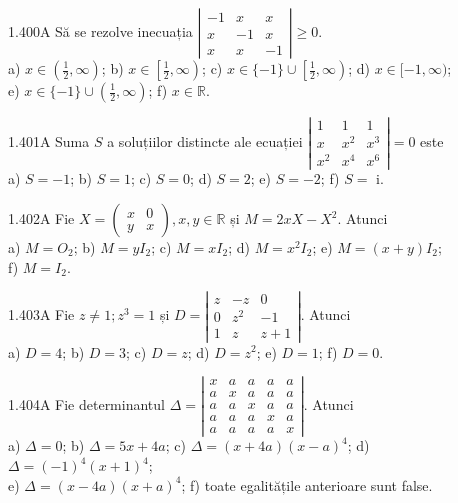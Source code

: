\documentclass[11pt]{article}
\begin{document}
1.400A Să se rezolve inecuația $\left|\begin{array}{ccc}-1 & x & x \\ x & -1 & x \\ x & x & -1\end{array}\right| \geq 0$.\\ a) $x \in\left(\frac{1}{2}, \infty\right)$; b) $x \in\left[\frac{1}{2}, \infty\right)$; c) $x \in\{-1\} \cup\left[\frac{1}{2}, \infty\right)$; d) $x \in[-1, \infty)$;\\ e) $x \in\{-1\} \cup\left(\frac{1}{2}, \infty\right)$; f) $x \in \mathbb{R}$.

1.401A Suma $S$ a soluțiilor distincte ale ecuației $\left|\begin{array}{ccc}1 & 1 & 1 \\ x & x^{2} & x^{3} \\ x^{2} & x^{4} & x^{6}\end{array}\right|=0$ este\\ a) $S=-1$; b) $S=1$; c) $S=0$; d) $S=2$; e) $S=-2$; f) $S=$ i.

1.402A Fie $X=\left(\begin{array}{ll}x & 0 \\ y & x\end{array}\right), x, y \in \mathbb{R}$ și $M=2 x X-X^{2}$. Atunci\\ a) $M=O_{2}$; b) $M=y I_{2}$; c) $M=x I_{2}$; d) $M=x^{2} I_{2}$; e) $M=(x+y) I_{2}$;\\ f) $M=I_{2}$.

1.403A Fie $z \neq 1 ; z^{3}=1$ și $D=\left|\begin{array}{ccc}z & -z & 0 \\ 0 & z^{2} & -1 \\ 1 & z & z+1\end{array}\right|$. Atunci\\ a) $D=4$; b) $D=3$; c) $D=z$; d) $D=z^{2}$; e) $D=1$; f) $D=0$.

1.404A Fie determinantul $\Delta=\left|\begin{array}{lllll}x & a & a & a & a \\ a & x & a & a & a \\ a & a & x & a & a \\ a & a & a & x & a \\ a & a & a & a & x\end{array}\right|$. Atunci\\ a) $\Delta=0$; b) $\Delta=5 x+4 a$; c) $\Delta=(x+4 a)(x-a)^{4}$; d) $\Delta=(-1)^{4}(x+1)^{4}$;\\ e) $\left.\Delta=(x-4 a)(x+a)^{4}\right.$; f) toate egalitățile anterioare sunt false.
\end{document}
